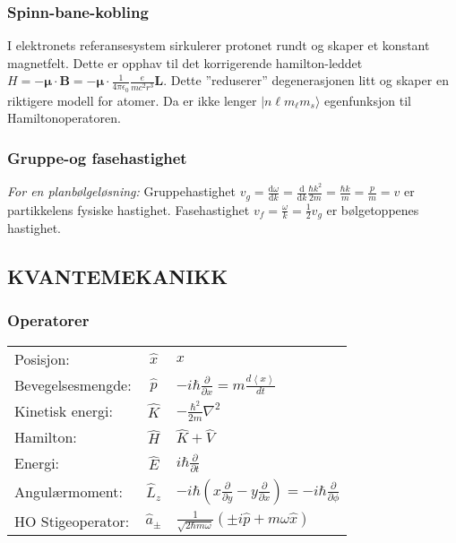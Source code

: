 \documentclass[a4paper, norsk, 8pt]{article}
\newcommand{\PAR}[2]{ \frac{\partial #1}{\partial #2}}
\newcommand{\expe}[1] { \left\langle#1\right\rangle }
\newcommand{\ket}[1] { |#1\rangle }
\begin{document}
\begin{multicols*}{3}
\subsubsection*{\scriptsize Spinn-bane-kobling}
I elektronets referansesystem sirkulerer protonet rundt og skaper et konstant magnetfelt. Dette er opphav til det korrigerende hamilton-leddet $H=-\mathbf{\mu}\cdot\mathbf{B}=-\mathbf{\mu}\cdot \frac{1}{4\pi \epsilon_0}\frac{e}{mc^2 r^3}\mathbf{L}$. Dette ''reduserer'' degenerasjonen litt og skaper en riktigere modell for atomer. Da er ikke lenger $\ket{n\ell m_\ell m_s}$ egenfunksjon til Hamiltonoperatoren.

\subsubsection*{\scriptsize Gruppe-og fasehastighet}
\textit{For en planbølgeløsning:}
Gruppehastighet $v_g = \frac{\mbox{d}\omega}{\mbox{d}k}=\frac{\mbox{d}}{\mbox{d}k}\frac{\hbar k^2}{2m}=\frac{\hbar k}{m}=\frac{p}{m}=v$ er partikkelens fysiske hastighet. Fasehastighet $v_f = \frac{\omega}{k} = \frac{1}{2}v_g$ er bølgetoppenes hastighet.  

\subsection*{\footnotesize KVANTEMEKANIKK}
\subsubsection*{\scriptsize Operatorer} 
\begin{tabular}{|l|c|l|}
\hline
Posisjon: 				& $\hat{x}$		& $x$ \\ 
Bevegelsesmengde: 		& $\hat{p}$		& $-i\hbar \frac{\partial}{\partial x}=m\frac{d\expe{x}}{dt}$ 			\\ 
Kinetisk energi:	 	& $\hat{K}$		& $-\frac{\hbar^2}{2m}\nabla^2$ 										\\ 
Hamilton:				& $\hat{H}$		& $\hat{K}+\hat{V}$ 													\\ 
Energi:					& $\hat{E}$		& $i\hbar \PAR{}{t}$ 													\\ 
Angulærmoment:			& $\hat{L}_z$	& $-i\hbar\left(x\PAR{}{y}-y\PAR{}{x}\right)=-i\hbar\PAR{}{\phi}$ 		\\
HO Stigeoperator:		& $\hat{a}_\pm$	& $\frac{1}{\sqrt{2\hbar m \omega}}\left(\pm i\hat{p}+m\omega\hat{x}\right)$ 		\\ \hline
\end{tabular}


\end{multicols*}
\end{document}
